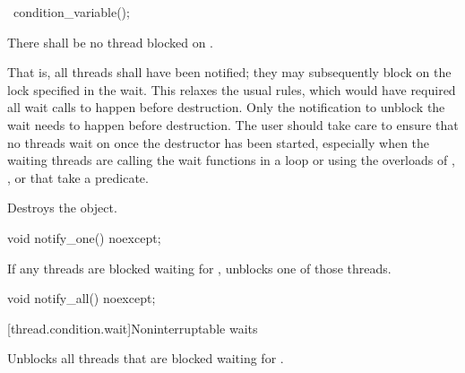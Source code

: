 %
\begin{itemdecl}
~condition_variable();
\end{itemdecl}

\begin{itemdescr}
\pnum
\requires There shall be no thread blocked on . \begin{note} That is, all
threads shall have been notified; they may subsequently block on the lock specified in the
wait.
This relaxes the usual rules, which would have required all wait calls to happen before
destruction. Only the notification to unblock the wait needs to happen before destruction.
The user should take care to ensure that no threads wait on  once the destructor has
been started, especially when the waiting threads are calling the wait functions in a loop or
using the overloads of , , or  that take a predicate.
\end{note}

\pnum\effects Destroys the object.
\end{itemdescr}

%
\begin{itemdecl}
void notify_one() noexcept;
\end{itemdecl}

\begin{itemdescr}
\pnum\effects If any threads are blocked waiting for , unblocks one of those threads.
\end{itemdescr}

%
\begin{itemdecl}
void notify_all() noexcept;
\end{itemdecl}


{\color{insertcolor}
[thread.condition.wait]{Noninterruptable waits}
}


\begin{itemdescr}
\pnum\effects Unblocks all threads that are blocked waiting for .
\end{itemdescr}

